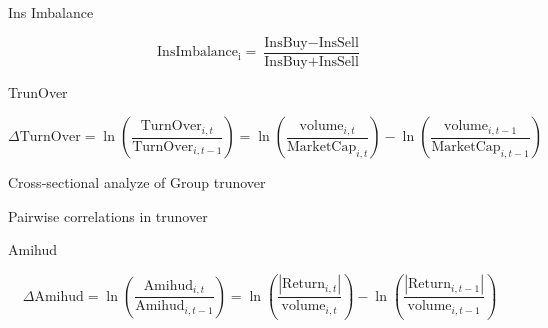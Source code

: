 \documentclass{beamer}
\begin{document}
	\begin{frame}{Ins Imbalance}

			 \begin{equation*}
				 \text{InsImbalance}_\text{i} = \frac{\text{InsBuy} - \text{InsSell}}{\text{InsBuy} + \text{InsSell}}
			\end{equation*}

				\begin{table}[htbp]
			\centering
			\resizebox{1\textheight}{!}{
				
			}
		\end{table}
	
	\end{frame}
	\begin{frame}{TrunOver}
	
	\begin{equation*}
		\Delta \text{TurnOver} = \ln(\frac{\text{TurnOver}_{i,t}}{\text{TurnOver}_{i,t-1}}) = 
		\ln({\frac{\text{volume}_{i,t}}{\text{MarketCap}_{i,t}}}) - \ln({\frac{\text{volume}_{i,t-1}}{\text{MarketCap}_{i,t-1}}})
	\end{equation*}
	
	\begin{table}[htbp]
		\centering
		\resizebox{0.75\textheight}{!}{
			
		}
	\end{table}
	
\end{frame}
\begin{frame}{Cross-sectional analyze of Group trunover}
	\begin{table}[htbp]
\centering
		\resizebox{0.95\textwidth}{!}{
			\centering
			
		}
		\label{Turnovercrosssection}
	\end{table}
\end{frame}

\begin{frame}{Pairwise correlations in  trunover}
	\begin{table}[htbp]
		\centering
		\resizebox{0.95\textwidth}{!}{
			\centering
			
		}
		\label{mresult2-turnover}
	\end{table}
\end{frame}


\begin{frame}{Amihud}
	
	\begin{equation*}
		\Delta \text{Amihud} = \ln(\frac{\text{Amihud}_{i,t}}{\text{Amihud}_{i,t-1}}) = 
		\ln({\frac{|\text{Return}_{i,t}|}{\text{volume}_{i,t}}}) - \ln({\frac{|\text{Return}_{i,t-1}|}{\text{volume}_{i,t-1}}})
	\end{equation*}

	\begin{table}[htbp]
	\centering
	\resizebox{0.9\textheight}{!}{
		
	}
\end{table}
	
	
\end{frame}
\end{document}
